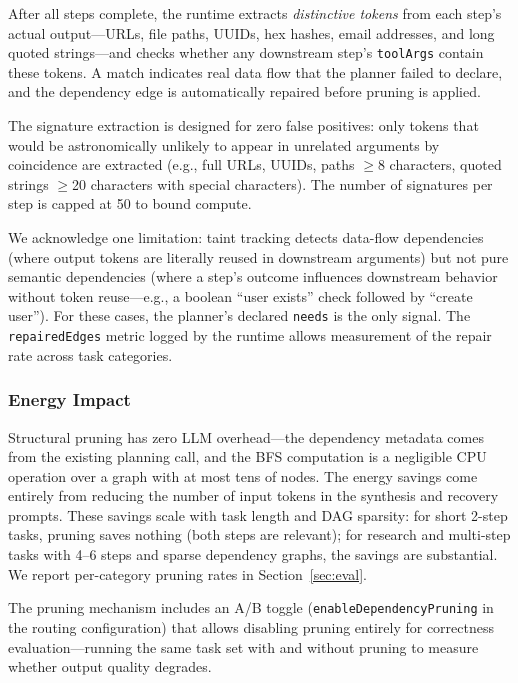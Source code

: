 After all steps complete, the runtime extracts \emph{distinctive tokens} from each step's actual output---URLs, file paths, UUIDs, hex hashes, email addresses, and long quoted strings---and checks whether any downstream step's \texttt{toolArgs} contain these tokens. A match indicates real data flow that the planner failed to declare, and the dependency edge is automatically repaired before pruning is applied.

The signature extraction is designed for zero false positives: only tokens that would be astronomically unlikely to appear in unrelated arguments by coincidence are extracted (e.g., full URLs, UUIDs, paths $\geq$8 characters, quoted strings $\geq$20 characters with special characters). The number of signatures per step is capped at 50 to bound compute.

We acknowledge one limitation: taint tracking detects data-flow dependencies (where output tokens are literally reused in downstream arguments) but not pure semantic dependencies (where a step's outcome influences downstream behavior without token reuse---e.g., a boolean ``user exists'' check followed by ``create user''). For these cases, the planner's declared \texttt{needs} is the only signal. The \texttt{repairedEdges} metric logged by the runtime allows measurement of the repair rate across task categories.

\subsubsection{Energy Impact}

Structural pruning has zero LLM overhead---the dependency metadata comes from the existing planning call, and the BFS computation is a negligible CPU operation over a graph with at most tens of nodes. The energy savings come entirely from reducing the number of input tokens in the synthesis and recovery prompts. These savings scale with task length and DAG sparsity: for short 2-step tasks, pruning saves nothing (both steps are relevant); for research and multi-step tasks with 4--6 steps and sparse dependency graphs, the savings are substantial. We report per-category pruning rates in Section~\ref{sec:eval}.

The pruning mechanism includes an A/B toggle (\texttt{enableDependencyPruning} in the routing configuration) that allows disabling pruning entirely for correctness evaluation---running the same task set with and without pruning to measure whether output quality degrades.


